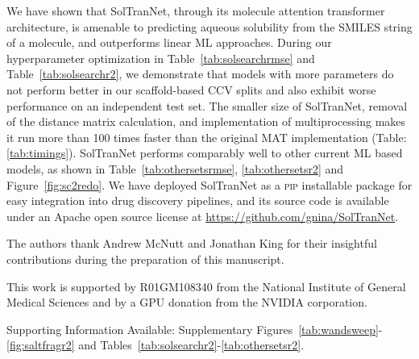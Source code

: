 \documentclass[journal=jmcmar,manuscript=article]{achemso}
\begin{document}
We have shown that SolTranNet, through its molecule attention transformer architecture, is amenable to predicting aqueous solubility from the SMILES string of a molecule, and outperforms linear ML approaches.
During our hyperparameter optimization in Table~\ref{tab:solsearchrmse} and Table~\ref{tab:solsearchr2}, we demonstrate that models with more parameters do not perform better in our scaffold-based CCV splits and also exhibit worse performance on an independent test set.
The smaller size of SolTranNet, removal of the distance matrix calculation, and implementation of multiprocessing makes it run more than 100 times faster than the original MAT implementation (Table:\ref{tab:timings}).
SolTranNet performs comparably well to other current ML based models, as shown in Table~\ref{tab:othersetsrmse}, \ref{tab:othersetsr2} and Figure~\ref{fig:sc2redo}.
We have deployed SolTranNet as a \textsc{pip} installable package for easy integration into drug discovery pipelines, and its source code is available under an Apache open source license at \url{https://github.com/gnina/SolTranNet}.

\begin{acknowledgement}


The authors thank Andrew McNutt and Jonathan King for their insightful contributions during the preparation of this manuscript.

This work is supported by R01GM108340 from the National Institute of General Medical Sciences and by a GPU donation from the NVIDIA corporation.

\end{acknowledgement}

\begin{suppinfo}

Supporting Information Available: Supplementary Figures~\ref{tab:wandsweep}-\ref{fig:saltfragr2} and Tables~\ref{tab:solsearchr2}-\ref{tab:othersetsr2}.
\end{suppinfo}


\end{document}
